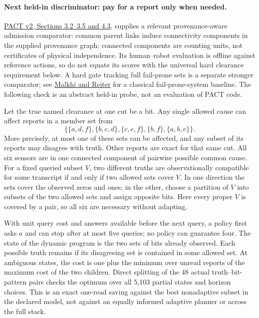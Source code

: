 \documentclass{article}
\begin{document}
\paragraph{Next held-in discriminator: pay for a report only when needed.}
\href{https://arxiv.org/html/2609.01662v2}{PACT v2, Sections 3.2--3.5
and 4.3}, supplies a relevant provenance-aware admission comparator:
common parent links induce connectivity components in the supplied
provenance graph; connected components are counting units, not
certificates of physical independence. Its human--robot evaluation is
offline against reference actions, so do not equate its scores with the
universal hard clearance requirement below. A hard gate tracking full
fail-prone sets is a separate stronger comparator; see
\href{https://users.ece.cmu.edu/~reiter/papers/1998/DC.pdf}{Malkhi and Reiter}
for a classical fail-prone-system baseline. The following check is an
abstract held-in probe, not an evaluation of PACT code.

Let the true named clearance at one cut be a bit. Any single allowed cause
can affect reports in a member set from
\[
 \{\{a,d,f\},\{b,c,d\},\{c,e,f\},\{b,f\},\{a,b,e\}\}.
\]
More precisely, at most one of these sets can be affected, and any
subset of its reports may disagree with truth. Other reports are exact
for that same cut. All six sensors are in one connected component of
pairwise possible common cause. For a fixed queried subset $V$, two
different truths are observationally compatible for some transcript
if and only if two allowed sets cover $V$. In one direction the sets
cover the observed zeros and ones; in the other, choose a partition
of $V$ into subsets of the two allowed sets and assign opposite bits.
Here every proper $V$ is covered by a pair, so all six are necessary
without adapting.

With unit query cost and answers available before the next query, a
policy first asks $a$ and can stop after at most five queries; no policy
can guarantee four. The state of the dynamic program is the two sets
of bits already observed. Each possible truth remains if its
disagreeing set is contained in some allowed set. At ambiguous states,
the cost is one plus the minimum over unread reports of the maximum
cost of the two children. Direct splitting of the 48 actual
truth--bit-pattern pairs checks the optimum over all 5,103 partial
states and horizon choices. This is an exact one-read saving against
the best nonadaptive subset in the declared model, not against an
equally informed adaptive planner or across the full stack.
\end{document}
